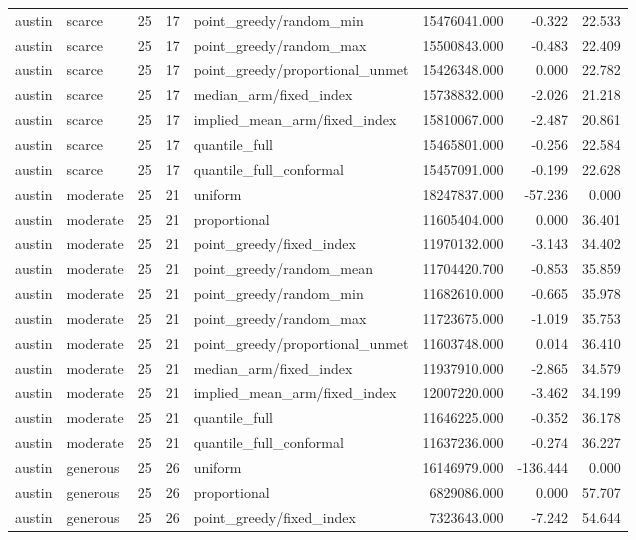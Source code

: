 \begin{tabular}{llrrlrrr}
austin & scarce & 25 & 17 & point\_greedy/random\_min & 15476041.000 & -0.322 & 22.533 \\
austin & scarce & 25 & 17 & point\_greedy/random\_max & 15500843.000 & -0.483 & 22.409 \\
austin & scarce & 25 & 17 & point\_greedy/proportional\_unmet & 15426348.000 & 0.000 & 22.782 \\
austin & scarce & 25 & 17 & median\_arm/fixed\_index & 15738832.000 & -2.026 & 21.218 \\
austin & scarce & 25 & 17 & implied\_mean\_arm/fixed\_index & 15810067.000 & -2.487 & 20.861 \\
austin & scarce & 25 & 17 & quantile\_full & 15465801.000 & -0.256 & 22.584 \\
austin & scarce & 25 & 17 & quantile\_full\_conformal & 15457091.000 & -0.199 & 22.628 \\
austin & moderate & 25 & 21 & uniform & 18247837.000 & -57.236 & 0.000 \\
austin & moderate & 25 & 21 & proportional & 11605404.000 & 0.000 & 36.401 \\
austin & moderate & 25 & 21 & point\_greedy/fixed\_index & 11970132.000 & -3.143 & 34.402 \\
austin & moderate & 25 & 21 & point\_greedy/random\_mean & 11704420.700 & -0.853 & 35.859 \\
austin & moderate & 25 & 21 & point\_greedy/random\_min & 11682610.000 & -0.665 & 35.978 \\
austin & moderate & 25 & 21 & point\_greedy/random\_max & 11723675.000 & -1.019 & 35.753 \\
austin & moderate & 25 & 21 & point\_greedy/proportional\_unmet & 11603748.000 & 0.014 & 36.410 \\
austin & moderate & 25 & 21 & median\_arm/fixed\_index & 11937910.000 & -2.865 & 34.579 \\
austin & moderate & 25 & 21 & implied\_mean\_arm/fixed\_index & 12007220.000 & -3.462 & 34.199 \\
austin & moderate & 25 & 21 & quantile\_full & 11646225.000 & -0.352 & 36.178 \\
austin & moderate & 25 & 21 & quantile\_full\_conformal & 11637236.000 & -0.274 & 36.227 \\
austin & generous & 25 & 26 & uniform & 16146979.000 & -136.444 & 0.000 \\
austin & generous & 25 & 26 & proportional & 6829086.000 & 0.000 & 57.707 \\
austin & generous & 25 & 26 & point\_greedy/fixed\_index & 7323643.000 & -7.242 & 54.644 \\

\end{tabular}
